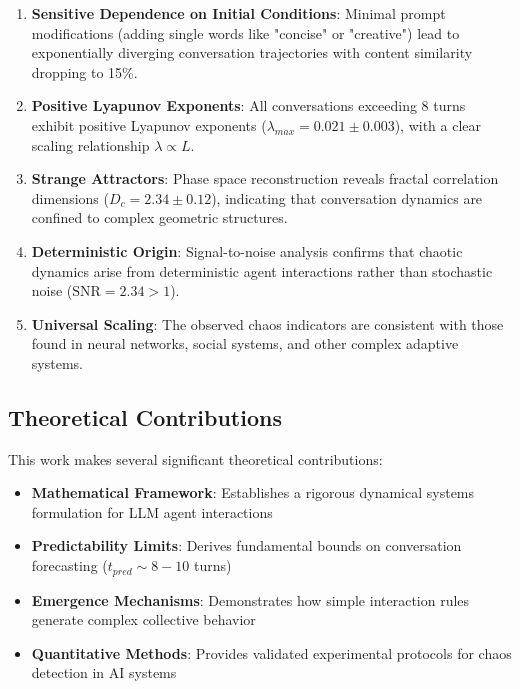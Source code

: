\documentclass[11pt,a4paper]{article}
\begin{document}
\begin{enumerate}
    \item \textbf{Sensitive Dependence on Initial Conditions}: Minimal prompt modifications (adding single words like "concise" or "creative") lead to exponentially diverging conversation trajectories with content similarity dropping to 15\%.

    \item \textbf{Positive Lyapunov Exponents}: All conversations exceeding 8 turns exhibit positive Lyapunov exponents ($\lambda_{max} = 0.021 \pm 0.003$), with a clear scaling relationship $\lambda \propto L$.

    \item \textbf{Strange Attractors}: Phase space reconstruction reveals fractal correlation dimensions ($D_c = 2.34 \pm 0.12$), indicating that conversation dynamics are confined to complex geometric structures.

    \item \textbf{Deterministic Origin}: Signal-to-noise analysis confirms that chaotic dynamics arise from deterministic agent interactions rather than stochastic noise ($\text{SNR} = 2.34 > 1$).

    \item \textbf{Universal Scaling}: The observed chaos indicators are consistent with those found in neural networks, social systems, and other complex adaptive systems.
\end{enumerate}

\subsection{Theoretical Contributions}

This work makes several significant theoretical contributions:

\begin{itemize}
    \item \textbf{Mathematical Framework}: Establishes a rigorous dynamical systems formulation for LLM agent interactions
    \item \textbf{Predictability Limits}: Derives fundamental bounds on conversation forecasting ($t_{pred} \sim 8-10$ turns)
    \item \textbf{Emergence Mechanisms}: Demonstrates how simple interaction rules generate complex collective behavior
    \item \textbf{Quantitative Methods}: Provides validated experimental protocols for chaos detection in AI systems
\end{itemize}
\end{document}
